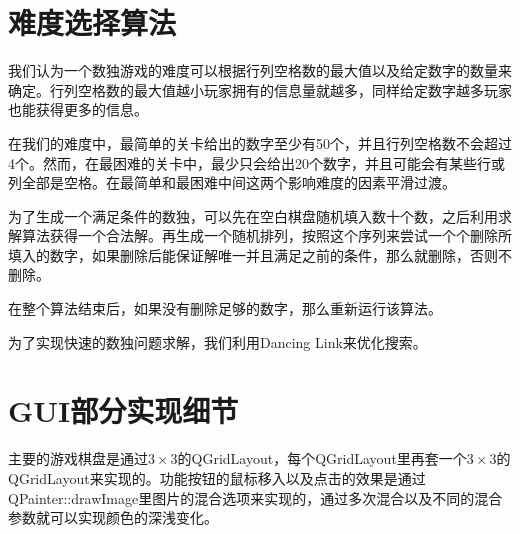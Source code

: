 \documentclass[11pt,a4paper]{article}
\begin{document}
\section{难度选择算法}
我们认为一个数独游戏的难度可以根据行列空格数的最大值以及给定数字的数量来确定。行列空格数的最大值越小玩家拥有的信息量就越多，同样给定数字越多玩家也能获得更多的信息。

在我们的难度中，最简单的关卡给出的数字至少有50个，并且行列空格数不会超过4个。然而，在最困难的关卡中，最少只会给出20个数字，并且可能会有某些行或列全部是空格。在最简单和最困难中间这两个影响难度的因素平滑过渡。

为了生成一个满足条件的数独，可以先在空白棋盘随机填入数十个数，之后利用求解算法获得一个合法解。再生成一个随机排列，按照这个序列来尝试一个个删除所填入的数字，如果删除后能保证解唯一并且满足之前的条件，那么就删除，否则不删除。

在整个算法结束后，如果没有删除足够的数字，那么重新运行该算法。

为了实现快速的数独问题求解，我们利用Dancing Link来优化搜索。
\section{GUI部分实现细节}
主要的游戏棋盘是通过$3\times 3$的QGridLayout，每个QGridLayout里再套一个$3\times 3$的QGridLayout来实现的。功能按钮的鼠标移入以及点击的效果是通过QPainter::drawImage里图片的混合选项来实现的，通过多次混合以及不同的混合参数就可以实现颜色的深浅变化。
\end{document}
